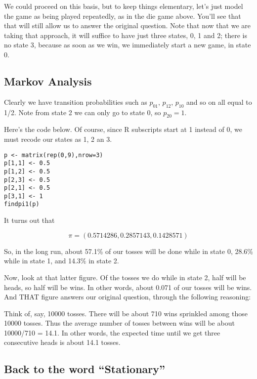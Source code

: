 We could proceed on this basis, but to keep things elementary, let's
just model the game as being played repeatedly, as in the die game
above.  You'll see that that will still allow us to answer the original
question.  Note that now that we are taking that approach, it will
suffice to have just three states, 0, 1 and 2; there is no state 3,
because as soon as we win, we immediately start a new game, in state 0.

\subsection{Markov Analysis}
\label{markovanalysis}

Clearly we have transition probabilities such as $p_{01}$, $p_{12}$,
$p_{10}$ and so on all equal to 1/2.  Note from state 2 we can only go
to state 0, so $p_{20} = 1$.

Here's the code below.  Of course, since R subscripts start at 1 instead
of 0, we must recode our states as 1, 2 an 3.

\label{codesnippets}
\begin{Verbatim}[fontsize=\relsize{-2}]
p <- matrix(rep(0,9),nrow=3)
p[1,1] <- 0.5
p[1,2] <- 0.5
p[2,3] <- 0.5
p[2,1] <- 0.5
p[3,1] <- 1
findpi1(p)
\end{Verbatim}

It turns out that

\begin{equation}
\label{pi57}
\pi = (0.5714286, 0.2857143, 0.1428571)
\end{equation}

So, in the long run, about 57.1\% of our tosses will be done while in state
0, 28.6\% while in state 1, and 14.3\% in state 2.

Now, look at that latter figure.  Of the tosses we do while in state 2,
half will be heads, so half will be wins.  In other words, about 0.071
of our tosses will be wins.  And THAT figure answers our original
question, through the following reasoning:

Think of, say, 10000 tosses.  There will be about 710 wins sprinkled
among those 10000 tosses.  Thus the average number of tosses between wins
will be about 10000/710 = 14.1.  In other words, the expected time until
we get three consecutive heads is about 14.1 tosses.

\subsection{Back to the word ``Stationary''}
\label{backstation}

